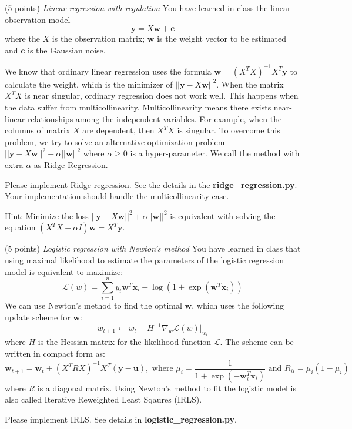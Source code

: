 \documentclass[a4paper, 12pt]{exam}
\begin{document}
\begin{questions}
\question (5 points) \emph{Linear regression with regulation} You have learned in class the linear observation model
\begin{equation*}
\bm{y} = X\bm{w} + \bm{c}
\end{equation*}
where the $X$ is the observation matrix;
$\bm{w}$ is the weight vector to be estimated and $\bm{c}$ is the Gaussian noise.

We know that ordinary linear regression uses the formula $\bm{w} = (X^TX)^{-1}X^T\bm{y}$ to calculate the weight, which is the minimizer
of $||\bm{y} - X\bm{w}||^2$.
When the matrix $X^TX$ is near singular, ordinary regression does not work well. This happens when
the data suffer from multicollinearity. Multicollinearity means there exists near-linear relationships among the independent variables.
For example, when the columns of matrix $X$ are dependent, then $X^TX$ is singular. To overcome this problem, we try to solve an alternative optimization problem
$||\bm{y} - X\bm{w}||^2 + \alpha ||\bm{w}||^2$ where $\alpha \geq 0$ is a hyper-parameter. We call the method with extra $\alpha$ as Ridge Regression.

Please implement Ridge regression. See the details in the \textbf{ridge\_regression.py}.
Your implementation should handle the multicollinearity case.

Hint: Minimize the loss $||\bm{y} - X\bm{w}||^2 + \alpha ||\bm{w}||^2$ is equivalent with solving the equation
$( X^T X+ \alpha I)\bm{w}  = X^T \bm{y}$.

\question (5 points) \emph{Logistic regression with Newton's method} You have learned in class that using maximal likelihood to estimate the parameters of the logistic regression model is equivalent to maximize:
\begin{equation*}
\mathcal{L}(w) = \sum_{i=1}^n y_i \bm{w}^T \bm{x}_i - \log ( 1 + \exp(\bm{w}^T \bm{x}_i))
\end{equation*}
We can use Newton's method to find the optimal $\bm{w}$, which uses the following update scheme for $\bm{w}$:
\begin{equation*}
w_{t+1} \leftarrow w_t - H^{-1} \nabla_w \mathcal{L}(w)|_{w_t}
\end{equation*}
where $H$ is the Hessian matrix for the likelihood function $\mathcal{L}$.
The scheme can be written in compact form as:
\begin{equation*}
\bm{w}_{t+1} = \bm{w}_t + (X^TRX)^{-1} X^T(\bm{y}-\bm{u}), \textrm{ where } \mu_i = \frac{1}{1+\exp(-\bm{w}_i^T\bm{x}_i)} \textrm{ and } R_{ii} = \mu_i ( 1 - \mu_i)
\end{equation*}
where $R$ is a diagonal matrix. Using Newton's method to fit the logistic model is also called Iterative Reweighted Least Sqaures (IRLS).

Please implement IRLS. See details in \textbf{logistic\_regression.py}.

\end{questions}
\end{document}
